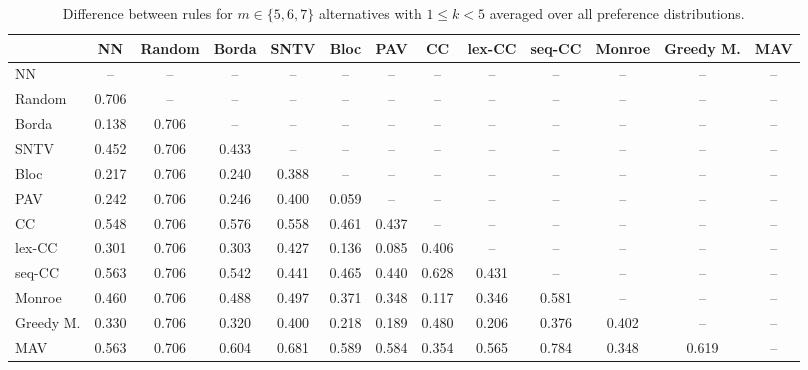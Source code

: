 
\begin{table*}[h!]
\centering
\begin{tabular}{lcccccccccccc}
\toprule
 & NN & Random & Borda & SNTV & Bloc & PAV & CC & lex-CC & seq-CC & Monroe & Greedy M. & MAV \\
\midrule
NN & -- & -- & -- & -- & -- & -- & -- & -- & -- & -- & -- & -- \\
Random & 0.706 & -- & -- & -- & -- & -- & -- & -- & -- & -- & -- & -- \\
Borda & 0.138 & 0.706 & -- & -- & -- & -- & -- & -- & -- & -- & -- & -- \\
SNTV & 0.452 & 0.706 & 0.433 & -- & -- & -- & -- & -- & -- & -- & -- & -- \\
Bloc & 0.217 & 0.706 & 0.240 & 0.388 & -- & -- & -- & -- & -- & -- & -- & -- \\
PAV & 0.242 & 0.706 & 0.246 & 0.400 & 0.059 & -- & -- & -- & -- & -- & -- & -- \\
CC & 0.548 & 0.706 & 0.576 & 0.558 & 0.461 & 0.437 & -- & -- & -- & -- & -- & -- \\
lex-CC & 0.301 & 0.706 & 0.303 & 0.427 & 0.136 & 0.085 & 0.406 & -- & -- & -- & -- & -- \\
seq-CC & 0.563 & 0.706 & 0.542 & 0.441 & 0.465 & 0.440 & 0.628 & 0.431 & -- & -- & -- & -- \\
Monroe & 0.460 & 0.706 & 0.488 & 0.497 & 0.371 & 0.348 & 0.117 & 0.346 & 0.581 & -- & -- & -- \\
Greedy M. & 0.330 & 0.706 & 0.320 & 0.400 & 0.218 & 0.189 & 0.480 & 0.206 & 0.376 & 0.402 & -- & -- \\
MAV & 0.563 & 0.706 & 0.604 & 0.681 & 0.589 & 0.584 & 0.354 & 0.565 & 0.784 & 0.348 & 0.619 & -- \\
\bottomrule
\end{tabular}

\caption{Difference between rules for $m \in \{5, 6, 7\}$ alternatives with $1 \leq k < 5$ averaged over all preference distributions.}
\end{table*}
